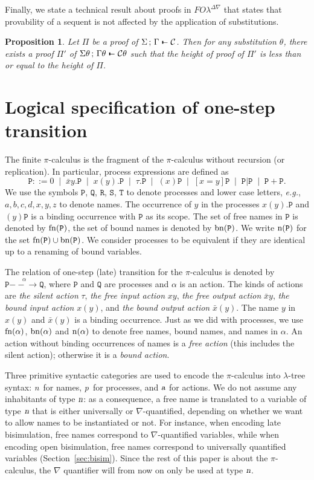 \documentclass{acmtrans2m}
\newtheorem{proposition}[theorem]{Proposition}
\def\Cscr{{\mathcal C}}
\def\Ppi{{\mathtt P}}
\def\Qpi{{\mathtt Q}}
\def\Rpi{{\mathtt R}}
\def\Spi{{\mathtt S}}
\def\Tpi{{\mathtt T}}
\def\relbar{\mathrel{\smash-}}
\def\joinrelm{\mathrel{\mkern-3.2mu}}
\def\tailpiece{\kern 1pt\vrule height 1ex width 0.3ex depth -.25ex}
\def\seqsym{\mathrel{\tailpiece\joinrelm\relbar}}
\newcommand{\sep}{\;\mid\;}
\newcommand{\FOL   }{FO\lambda}
\newcommand{\FOLDNb}{\FOL^{\Delta\nabla}}
\newcommand{\NSeq}[3]{#1\,;\,#2 \seqsym #3}
\newcommand{\action}{\hbox{\sl a}}
\newcommand{\name}{\hbox{\sl n}}
\newcommand{\one  }[3]{#1\stackrel{#2}{-\!\!-\!\!\!\rightarrow    } #3}
\newcommand{\proc}{\hbox{\sl p}}
\newcommand{\fn}[1]{{\rm fn}(#1)}
\newcommand{\bn}[1]{{\rm bn}(#1)}
\newcommand{\n}[1]{{\rm n}(#1)}
\begin{document}
Finally, we state a technical result about proofs in $\FOLDNb$ that
states that provability of a sequent is not affected by the
application of substitutions.

\begin{proposition}
\label{prop:subst}
Let $\Pi$ be a proof of $\NSeq{\Sigma}{\Gamma}{\Cscr}$. 
Then for any substitution $\theta$, there exists a proof $\Pi'$ of 
$\NSeq{\Sigma\theta}{\Gamma\theta}{\Cscr\theta}$ such that
the height of proof of $\Pi'$ is less than or equal to the height of $\Pi$.
\end{proposition}


\section{Logical specification of one-step transition}

The finite $\pi$-calculus is the fragment of the $\pi$-calculus
without recursion (or replication). 
In particular, process expressions are defined as
$$
\Ppi ::= 0 \sep \bar{x}y.\Ppi \sep x(y).\Ppi \sep \tau.\Ppi \sep
       (x)\Ppi \sep [x = y] \Ppi \sep \Ppi | \Ppi \sep \Ppi + \Ppi.
$$
We use the symbols $\Ppi$, $\Qpi$, $\Rpi$, $\Spi$, $\Tpi$ to
denote processes and  lower case letters, {\em e.g.}, $a, b, c, d, x, y, z$
to denote names.
The occurrence of $y$ in the processes $x(y).\Ppi$ and $(y)\Ppi$ is a binding 
occurrence with $\Ppi$ as its scope. 
The set of free names in $\Ppi$ is denoted by $\fn{\Ppi}$, the set of bound
names is denoted by $\bn{\Ppi}$. We write $\n{\Ppi}$ for the set
$\fn{\Ppi} \cup \bn{\Ppi}$. We consider processes to be equivalent 
if they are identical up to a renaming of bound variables.


The relation of one-step (late) transition \cite{milner92icII} for the
$\pi$-calculus is denoted by $\one{\Ppi}{\alpha}{\Qpi}$, 
where $\Ppi$ and $\Qpi$ are processes and $\alpha$ is an action. 
The kinds of actions are {\em the silent action} $\tau$, 
{\em the free  input action} $x y$, 
{\em the free output action} $\bar{x}y$, 
{\em the bound input action} $x(y)$, and
{\em the bound output action} $\bar{x}(y)$. The name $y$ in $x(y)$ and
$\bar{x}(y)$ is a binding occurrence. Just as we did with processes, we use
$\fn{\alpha}$, $\bn{\alpha}$ and $\n{\alpha}$ to denote free names,
bound names, and names in $\alpha$. An action without binding
occurrences of names is a {\em free action} (this includes the silent action); 
otherwise it is a {\em bound action}. 

Three primitive syntactic categories are used to encode the
$\pi$-calculus into $\lambda$-tree syntax: \name\ for names, \proc\
for processes, and $\action$ for actions.  We do not assume any
inhabitants of type $\name$: as a consequence, a free name is
translated to a variable of type $\name$ that is either universally or
$\nabla$-quantified, depending on whether we want to allow names to
be instantiated or not. For instance, when encoding late bisimulation,
free names correspond to $\nabla$-quantified variables, while when
encoding open bisimulation, free names correspond to universally
quantified variables (Section~\ref{sec:bisim}).  Since the rest of
this paper is about the $\pi$-calculus, the $\nabla$ quantifier will
from now on only be used at type $\name$.
\end{document}
